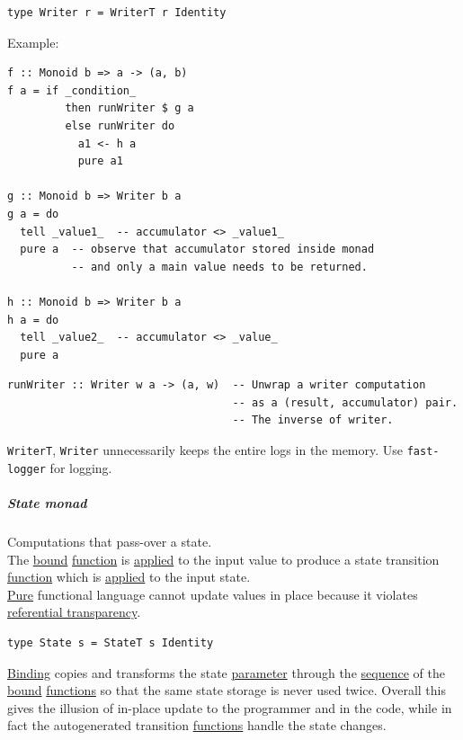 \documentclass[a4paper,14pt,oneside]{book}
\begin{document}
\begin{verbatim}
type Writer r = WriterT r Identity
\end{verbatim}

Example:\\
\begin{verbatim}
f :: Monoid b => a -> (a, b)
f a = if _condition_
         then runWriter $ g a
         else runWriter do
           a1 <- h a
           pure a1

g :: Monoid b => Writer b a
g a = do
  tell _value1_  -- accumulator <> _value1_
  pure a  -- observe that accumulator stored inside monad
          -- and only a main value needs to be returned.

h :: Monoid b => Writer b a
h a = do
  tell _value2_  -- accumulator <> _value_
  pure a
\end{verbatim}

\begin{verbatim}
runWriter :: Writer w a -> (a, w)  -- Unwrap a writer computation
                                   -- as a (result, accumulator) pair.
                                   -- The inverse of writer.
\end{verbatim}

\texttt{WriterT}, \texttt{Writer} unnecessarily keeps the entire logs in the memory. Use \texttt{fast-logger} for logging.\\

\subparagraph{\label{org073ef8d}State monad}
\label{sec:org2d284fa}
Computations that pass-over a state.\\

The \hyperref[org616bef9]{bound} \hyperref[org25ee224]{function} is \hyperref[org277c4f3]{applied} to the input value to produce a state transition \hyperref[org25ee224]{function} which is \hyperref[org277c4f3]{applied} to the input state.\\

\hyperref[org662733c]{Pure} functional language cannot update values in place because it violates \hyperref[orga5e1067]{referential transparency}.\\

\begin{verbatim}
type State s = StateT s Identity
\end{verbatim}

\hyperref[orgf1d8881]{Binding} copies and transforms the state \hyperref[org1f37c16]{parameter} through the \hyperref[org5549fb7]{sequence} of the \hyperref[org616bef9]{bound} \hyperref[org0da3116]{functions} so that the same state storage is never used twice. Overall this gives the illusion of in-place update to the programmer and in the code, while in fact the autogenerated transition \hyperref[org0da3116]{functions} handle the state changes.\\
\end{document}
